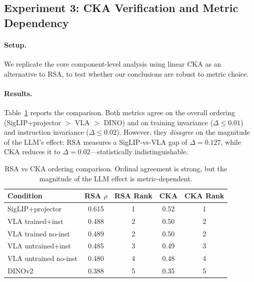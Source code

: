 \documentclass[letterpaper]{article}
\begin{document}
\subsection{Experiment 3: CKA Verification and Metric Dependency}
\label{sec:exp3}

\paragraph{Setup.}
We replicate the core component-level analysis using linear CKA as an alternative to RSA, to test whether our conclusions are robust to metric choice.

\paragraph{Results.}
Table~\ref{tab:cka_rsa} reports the comparison.
Both metrics agree on the overall ordering (SigLIP+projector $>$ VLA $>$ DINO) and on training invariance ($\Delta\leq0.01$) and instruction invariance ($\Delta\leq0.02$).
However, they \emph{disagree} on the magnitude of the LLM's effect: RSA measures a SigLIP-vs-VLA gap of $\Delta=0.127$, while CKA reduces it to $\Delta=0.02$---statistically indistinguishable.

\begin{table}[t]
\centering
\caption{RSA vs CKA ordering comparison. Ordinal agreement is strong, but the magnitude of the LLM effect is metric-dependent.}
\label{tab:cka_rsa}
\small
\begin{tabular}{lcccc}
\toprule
\textbf{Condition} & \textbf{RSA $\rho$} & \textbf{RSA Rank} & \textbf{CKA} & \textbf{CKA Rank} \\
\midrule
SigLIP+projector & 0.615 & 1 & 0.52 & 1 \\
VLA trained+inst & 0.488 & 2 & 0.50 & 2 \\
VLA trained no-inst & 0.489 & 2 & 0.50 & 2 \\
VLA untrained+inst & 0.485 & 3 & 0.49 & 3 \\
VLA untrained no-inst & 0.480 & 4 & 0.48 & 4 \\
DINOv2 & 0.388 & 5 & 0.35 & 5 \\
\bottomrule
\end{tabular}
\end{table}
\end{document}
